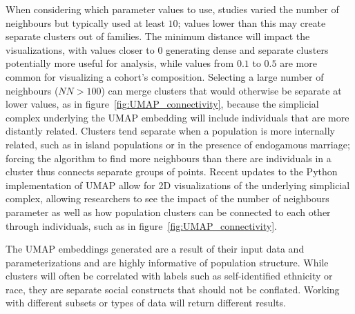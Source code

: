\documentclass[12pt]{article}
\begin{document}
When considering which parameter values to use, studies varied the number of neighbours but typically used at least $10$; values lower than this may create separate clusters out of families. The minimum distance will impact the visualizations, with values closer to $0$ generating dense and separate clusters potentially more useful for analysis, while values from $0.1$ to $0.5$ are more common for visualizing a cohort's composition. Selecting a large number of neighbours ($NN > 100$) can merge clusters that would otherwise be separate at lower values, as in figure~\ref{fig:UMAP_connectivity}, because the simplicial complex underlying the UMAP embedding will include individuals that are more distantly related. Clusters tend separate when a population is more internally related, such as in island populations or in the presence of endogamous marriage; forcing the algorithm to find more neighbours than there are individuals in a cluster thus connects separate groups of points. Recent updates to the Python implementation of UMAP allow for 2D visualizations of the underlying simplicial complex, allowing researchers to see the impact of the number of neighbours parameter as well as how population clusters can be connected to each other through individuals, such as in figure~\ref{fig:UMAP_connectivity}.

The UMAP embeddings generated are a result of their input data and parameterizations and are highly informative of population structure. While clusters will often be correlated with labels such as self-identified ethnicity or race, they are separate social constructs that should not be conflated. Working with different subsets or types of data will return different results.


\newpage
\end{document}
